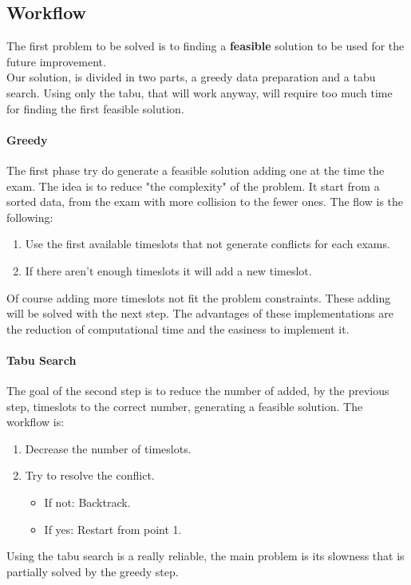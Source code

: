 \documentclass[12pt]{article}
\begin{document}
\subsection{Workflow}
The first problem to be solved is to finding a \textbf{feasible} solution to be used for the future improvement.\\
Our solution, is divided in two parts, a greedy data preparation and a tabu search. Using only the tabu, that will work anyway, will require too much time for finding the first feasible solution.\\
\paragraph{Greedy} The first phase try do generate a feasible solution adding one at the time the exam. The idea is to reduce "the complexity" of the problem. It start from a sorted data, from the exam with more collision to the fewer ones. The flow is the following:
\begin{enumerate}
  \item Use the first available timeslots that not generate conflicts for each exams.
  \item If there aren't enough timeslots it will add a new timeslot.
\end{enumerate}
Of course adding more timeslots not fit the problem constraints. These adding will be solved with the next step. The advantages of these implementations are the reduction of computational time and the easiness to implement it.

\paragraph{Tabu Search} The goal of the second step is to reduce the number of added, by the previous step, timeslots
to the correct number, generating a feasible solution. The workflow is:
\begin{enumerate}
  \item Decrease the number of timeslots.
  \item Try to resolve the conflict.
  \begin{itemize}
    \item If not: Backtrack.
    \item If yes: Restart from point 1.
  \end{itemize}
\end{enumerate}
Using the tabu search is a really reliable, the main problem is its slowness that is partially solved by the greedy step.\\
\end{document}
